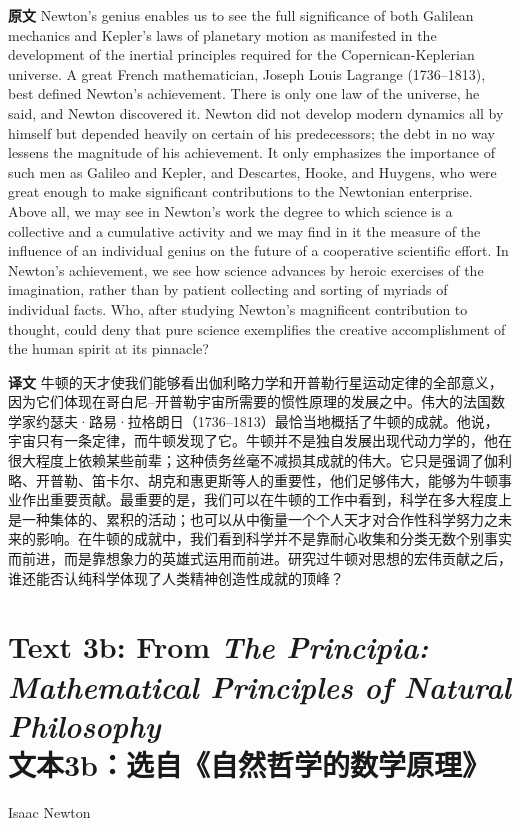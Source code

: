 \documentclass[UTF8,zihao=-4]{ctexart}
\begin{document}
\noindent\textbf{原文} Newton's genius enables us to see the full significance of both Galilean mechanics and Kepler's laws of planetary motion as manifested in the development of the inertial principles required for the Copernican-Keplerian universe. A great French mathematician, Joseph Louis Lagrange (1736--1813), best defined Newton's achievement. There is only one law of the universe, he said, and Newton discovered it. Newton did not develop modern dynamics all by himself but depended heavily on certain of his predecessors; the debt in no way lessens the magnitude of his achievement. It only emphasizes the importance of such men as Galileo and Kepler, and Descartes, Hooke, and Huygens, who were great enough to make significant contributions to the Newtonian enterprise. Above all, we may see in Newton's work the degree to which science is a collective and a cumulative activity and we may find in it the measure of the influence of an individual genius on the future of a cooperative scientific effort. In Newton's achievement, we see how science advances by heroic exercises of the imagination, rather than by patient collecting and sorting of myriads of individual facts. Who, after studying Newton's magnificent contribution to thought, could deny that pure science exemplifies the creative accomplishment of the human spirit at its pinnacle?
\par\noindent\textbf{译文} 牛顿的天才使我们能够看出伽利略力学和开普勒行星运动定律的全部意义，因为它们体现在哥白尼--开普勒宇宙所需要的惯性原理的发展之中。伟大的法国数学家约瑟夫·路易·拉格朗日（1736--1813）最恰当地概括了牛顿的成就。他说，宇宙只有一条定律，而牛顿发现了它。牛顿并不是独自发展出现代动力学的，他在很大程度上依赖某些前辈；这种债务丝毫不减损其成就的伟大。它只是强调了伽利略、开普勒、笛卡尔、胡克和惠更斯等人的重要性，他们足够伟大，能够为牛顿事业作出重要贡献。最重要的是，我们可以在牛顿的工作中看到，科学在多大程度上是一种集体的、累积的活动；也可以从中衡量一个个人天才对合作性科学努力之未来的影响。在牛顿的成就中，我们看到科学并不是靠耐心收集和分类无数个别事实而前进，而是靠想象力的英雄式运用而前进。研究过牛顿对思想的宏伟贡献之后，谁还能否认纯科学体现了人类精神创造性成就的顶峰？
\medskip

\section*{Text 3b: From \emph{The Principia: Mathematical Principles of Natural Philosophy}\\文本3b：选自《自然哲学的数学原理》}
\begin{flushright}
Isaac Newton
\end{flushright}
\end{document}
